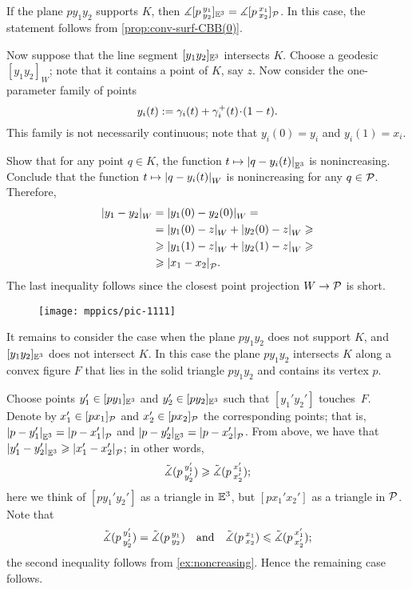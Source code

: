If the plane $py_1y_2$ supports $K$, then 
$\measuredangle[p\,{}^{y_1}_{y_2}]_{\mathbb{E}^3}=\measuredangle[p\,{}^{x_1}_{x_2}]_{\mathcal{P}}$.
In this case, the statement follows from \ref{prop:conv-surf-CBB(0)}.

Now suppose that the line segment $[y_1y_2]_{\mathbb{E}^3}$ intersects $K$.
Choose a geodesic $[y_1y_2]_W$;
note that it contains a point of $K$, say $z$.
Now consider the one-parameter family of points 
\[y_i(t)\df \gamma_i(t)+\gamma_i^+(t)\z\cdot (1-t).\]
This family is not necessarily continuous; note that $y_i(0)=y_i$ and $y_i(1)=x_i$.

Show that for any point $q\in K$, the function $t\mapsto |{q}-{y_i(t)}|_{\mathbb{E}^3}^{{}}$ is nonincreasing.
Conclude that the function $t\mapsto |{q}-{y_i(t)}|_{W}^{{}}$ is nonincreasing for any $q\in \mathcal{P}$.
Therefore, 
\begin{align*}
|{y_1}-{y_2}|_{W}^{{}}
&=|{y_1(0)}-{y_2(0)}|_{W}^{{}}=
\\
&=|{y_1(0)}-{z}|_{W}^{{}}+|{y_2(0)}-{z}|_{W}^{{}}\geqslant
\\
&\geqslant|{y_1(1)}-{z}|_{W}^{{}}+|{y_2(1)}-{z}|_{W}^{{}}\geqslant
\\
&\geqslant|{x_1}-{x_2}|_{\mathcal{P}}^{{}}.
\end{align*}
The last inequality follows since the closest point projection $W\to \mathcal{P}$ is short.

\begin{wrapfigure}{o}{28mm}
\vskip-3mm
\centering
\texttt{[image: mppics/pic-1111]}
\vskip-0mm
\end{wrapfigure}

It remains to consider the case when the plane $py_1y_2$ does not support $K$,
and $[y_1y_2]_{\mathbb{E}^3}$ does not intersect $K$.
In this case the plane $py_1y_2$ intersects $K$ along a convex figure $F$ that lies in the solid triangle 
$py_1y_2$ and contains its vertex $p$.

Choose points $y_1'\in [py_1]_{\mathbb{E}^3}$ and $y_2'\in [py_2]_{\mathbb{E}^3}$ such that $[y_1'y_2']$ touches~$F$.
Denote by $x_1'\in [px_1]_{\mathcal{P}}$ and $x_2'\in [px_2]_{\mathcal{P}}$ the corresponding points;
that is, $|{p}-{y_1'}|_{\mathbb{E}^3}^{{}}=|{p}-{x_1'}|_{\mathcal{P}}^{{}}$ and $|{p}-{y_2'}|_{\mathbb{E}^3}^{{}}=|{p}-{x_2'}|_{\mathcal{P}}^{{}}$.
From  above, we have that $|{y_1'}-{y_2'}|_{\mathbb{E}^3}^{{}}\geqslant|{x_1'}-{x_2'}|_{\mathcal{P}}^{{}}$;
in other words, 
\[\tilde\measuredangle(p\,{}^{y_1'}_{y_2'})\geqslant \tilde\measuredangle(p\,{}^{x_1'}_{x_2'});\]
here we think of  $[p{y_1'}{y_2'}]$ as a triangle in $\mathbb{E}^3$, but $[p{x_1'}{x_2'}]$ as a triangle in $\mathcal{P}$.
Note that 
\[\tilde\measuredangle(p\,{}^{y_1'}_{y_2'})=\tilde\measuredangle(p\,{}^{y_1}_{y_2})
\quad\text{and}\quad
\tilde\measuredangle(p\,{}^{x_1}_{x_2})\leqslant \tilde\measuredangle(p\,{}^{x_1'}_{x_2'});
\]
the second inequality follows from \ref{ex:noncreasing}.
Hence the remaining case follows.
